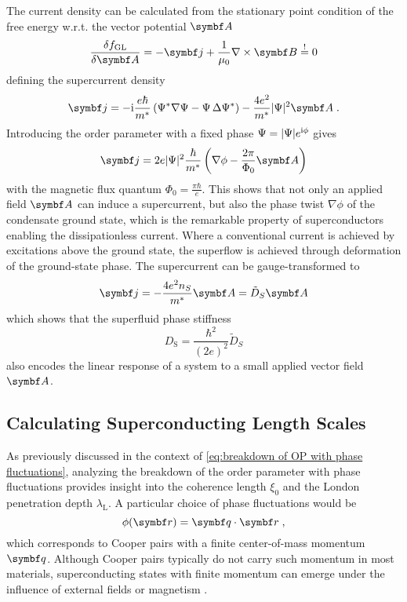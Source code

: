 \documentclass[../main.tex]{subfiles}
\begin{document}
The current density can be calculated from the stationary point condition of the free energy w.r.t. the vector potential \(\vb{A}\)
\begin{equation}
	\fdv{f_{\mathrm{GL}}}{\vb{A}} = -\vb{j} + \frac{1}{\mu_0} \nabla \times \vb{B} \overset{!}{=} 0
\end{equation}
defining the supercurrent density
\begin{equation}
	\vb{j} = -\iu \frac{e\hbar}{m^*} \left(\Psi^* \nabla \Psi - \Psi \adif{\Psi^*}\right) - \frac{4 e^2}{m^*} \vert \Psi \vert^2 \vb{A} \;.
	\label{eq:supercurrent density GL theory with phase and vector potential}
\end{equation}
Introducing the order parameter with a fixed phase \(\Psi = \vert \Psi \vert e^{\mathrm{i} \phi}\) gives
\begin{equation}
	\vb{j} = 2 e \vert \Psi \vert^2 \frac{\hbar}{m^*} \left(\nabla \phi - \frac{2 \pi}{\Phi_0} \vb{A} \right)
\end{equation}
with the magnetic flux quantum \(\Phi_0 = \frac{\pi \hbar}{e}\).
This shows that not only an applied field \(\vb{A}\) can induce a supercurrent, but also the phase twist \(\nabla \phi\) of the condensate ground state, which is the remarkable property of superconductors enabling the dissipationless current.
Where a conventional current is achieved by excitations above the ground state, the superflow is achieved through deformation of the ground-state phase.
The supercurrent can be gauge-transformed to
\begin{equation}
	\vb{j} = -\frac{4e^2 n_S}{m^*} \vb{A} = \tilde{D}_S \vb{A}
\end{equation}
which shows that the superfluid phase stiffness
\begin{equation}
	D_{\mathrm{S}} = \frac{\hbar^2}{(2e)^2} \tilde{D}_S
\end{equation}
also encodes the linear response of a system to a small applied vector field \(\vb{A}\).

\subsection*{Calculating Superconducting Length Scales}

As previously discussed in the context of \cref{eq:breakdown of OP with phase fluctuations}, analyzing the breakdown of the order parameter with phase fluctuations provides insight into the coherence length \(\xi_0\) and the London penetration depth \(\lambda_{\mathrm{L}}\).
A particular choice of phase fluctuations would be
\begin{equation}
	\phi (\vb{r}) = \vb{q} \cdot \vb{r} \;,
	\label{eq:phase fluctuations for finite momentum pairing}
\end{equation}
which corresponds to Cooper pairs with a finite center-of-mass momentum \(\vb{q}\).
Although Cooper pairs typically do not carry such momentum in most materials, superconducting states with finite momentum can emerge under the influence of external fields or magnetism \cite{chenFiniteMomentumCooper2018, wanOrbitalFuldeFerrell2023, yuanSupercurrentDiodeEffect2022}.
\end{document}
